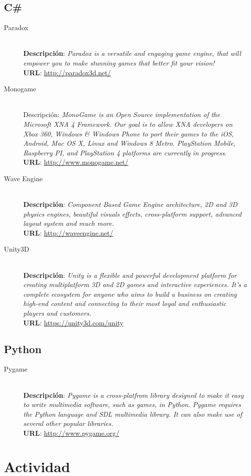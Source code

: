 \subsection{C\#}
\begin{description}
\item[Paradox] \hfill \\
\textbf{Descripción}: \emph{Paradox is a versatile and engaging game engine, that will empower you to make stunning games that better fit your vision!} \\
\textbf{URL}: \url{http://paradox3d.net/}
\item[Monogame] \hfill \\
Descripción: \emph{MonoGame is an Open Source implementation of the Microsoft XNA 4 Framework. Our goal is to allow XNA developers on Xbox 360, Windows \& Windows Phone to port their games to the iOS, Android, Mac OS X, Linux and Windows 8 Metro. PlayStation Mobile, Raspberry PI, and PlayStation 4 platforms are currently in progress.} \\
\textbf{URL}: \url{http://www.monogame.net/}
\item[Wave Engine] \hfill \\
\textbf{Descripción}: \emph{Component Based Game Engine architecture, 2D and 3D physics engines, beautiful visuals effects, cross-platform support, advanced layout system and much more.} \\
\textbf{URL}: \url{http://waveengine.net/}
\item[Unity3D] \hfill \\
\textbf{Descripción}: \emph{Unity is a flexible and powerful development platform for creating multiplatform 3D and 2D games and interactive experiences. It's a complete ecosystem for anyone who aims to build a business on creating high-end content and connecting to their most loyal and enthusiastic players and customers.} \\
\textbf{URL}: \url{https://unity3d.com/unity}
\end{description}

\subsection{Python}
\begin{description}
\item[Pygame] \hfill \\
\textbf{Descripción}: \emph{Pygame is a cross-platfrom library designed to make it easy to write multimedia software, such as games, in Python. Pygame requires the Python language and SDL multimedia library. It can also make use of several other popular libraries.} \\
\textbf{URL}: \url{http://www.pygame.org/}
\end{description}

\section{Actividad}
